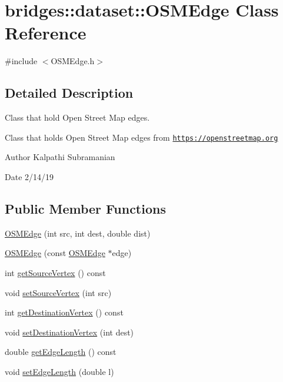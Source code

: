 \hypertarget{classbridges_1_1dataset_1_1_o_s_m_edge}{}\section{bridges\+:\+:dataset\+:\+:O\+S\+M\+Edge Class Reference}
\label{classbridges_1_1dataset_1_1_o_s_m_edge}


{\ttfamily \#include $<$O\+S\+M\+Edge.\+h$>$}



\subsection{Detailed Description}
Class that hold Open Street Map edges. 

Class that holds Open Street Map edges from \href{https://openstreetmap.org}{\tt https\+://openstreetmap.\+org}

\begin{DoxyAuthor}{Author}
Kalpathi Subramanian 
\end{DoxyAuthor}
\begin{DoxyDate}{Date}
2/14/19 
\end{DoxyDate}
\subsection*{Public Member Functions}
\begin{DoxyCompactItemize}
\item 
\mbox{\hyperlink{classbridges_1_1dataset_1_1_o_s_m_edge_a508445eef72b836a5cacd93f5daa4c58}{O\+S\+M\+Edge}} (int src, int dest, double dist)
\item 
\mbox{\hyperlink{classbridges_1_1dataset_1_1_o_s_m_edge_a8e412f87ed35e5667987de457e5609b6}{O\+S\+M\+Edge}} (const \mbox{\hyperlink{classbridges_1_1dataset_1_1_o_s_m_edge}{O\+S\+M\+Edge}} $\ast$edge)
\item 
int \mbox{\hyperlink{classbridges_1_1dataset_1_1_o_s_m_edge_a0cf6a06814288276a8c2342608d7b088}{get\+Source\+Vertex}} () const
\item 
void \mbox{\hyperlink{classbridges_1_1dataset_1_1_o_s_m_edge_ac8a56c77922a5729b42d1e39f3f6516f}{set\+Source\+Vertex}} (int src)
\item 
int \mbox{\hyperlink{classbridges_1_1dataset_1_1_o_s_m_edge_a691b1bf00e0523524a468a62bb606bcd}{get\+Destination\+Vertex}} () const
\item 
void \mbox{\hyperlink{classbridges_1_1dataset_1_1_o_s_m_edge_ab3b29d3d159aaf0784c88e375f7c218f}{set\+Destination\+Vertex}} (int dest)
\item 
double \mbox{\hyperlink{classbridges_1_1dataset_1_1_o_s_m_edge_a4317cc9c09aa9a5108031185047cb399}{get\+Edge\+Length}} () const
\item 
void \mbox{\hyperlink{classbridges_1_1dataset_1_1_o_s_m_edge_a469d98f2239f245b43d3475cbc8c0e74}{set\+Edge\+Length}} (double l)
\end{DoxyCompactItemize}


